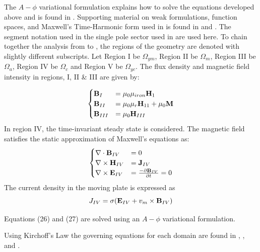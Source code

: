 \documentclass[lettersize,journal]{IEEEtran}
\begin{document}
The $A-\phi$ variational formulation explains how to solve the equations developed above and is found in \cite{fontchastagner_2017_axialfield}. Supporting material on weak formulations, function spaces, and Maxwell’s Time-Harmonic form used in \cite{fontchastagner_2017_axialfield} is found in \cite{kagerer_2018_finite} and \cite{kanayama_2000_an}. 
The segment notation used in the  single pole sector used in \cite{Lu2021-lr} are used here. 
To chain together the analysis from \cite{fontchastagner_2017_axialfield} to \cite{Lu2021-lr}, the regions of the geometry are denoted with slightly different subscripts. Let Region I be $\Omega_{ym}$, Region II be $\Omega_m$, Region III be $\Omega_a$, Region IV be $\Omega_c$ and Region V be $\Omega_{yc}$. The flux density and magnetic field intensity in regions, I, II & III  are given by:

\begin{equation}
\begin{aligned} 
\begin{cases}
\bold{B}_I &= \mu_0\mu_{iron}\bold{H}_1\\
\bold{B}_{II} &= \mu_0\mu_r\bold{H}_{11} + \mu_0\bold{M}\\
\bold{B}_{III} &= \mu_0\bold{H}_{III}
\end{cases} 
\end{aligned}
\end{equation}
In region IV, the time-invariant steady state is considered. The magnetic field satisfies the static approximation of Maxwell’s equations as:
\begin{equation}
\begin{aligned} 
\begin{cases}
\nabla\cdot  \bold{B}_{IV} &= 0\\
\nabla \times \bold{H}_{IV}&= \bold{J}_{IV}\\
\nabla \times \bold{E}_{IV} &= \frac{-\partial \bold{B}_{IV}}{\partial t} = 0
\end{cases} 
\end{aligned}
\end{equation}
The current density in the moving plate is expressed as
\begin{equation}
J_{IV} = \sigma(\bold{E}_{IV}+v_m\times \bold{B}_{IV})
\end{equation}

Equations (26) and (27) are solved using an $A-\phi$ variational formulation.

Using Kirchoff’s Law the governing equations for each domain are found in \cite{Lu2021-lr}, \cite{fontchastagner_2018_design}, and \cite{nehl_1994_nonlinear}.
\end{document}

